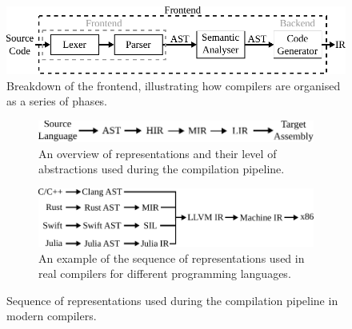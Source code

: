 \begin{figure}[h]
  \centering
  \includegraphics[scale=0.9]{src/background/figs/compiler-frontend.pdf}
  \caption{Breakdown of the frontend, illustrating how compilers are organised as a series of phases.}
  \label{fig:compiler-frontend}
\end{figure}

\begin{figure}[h]
\centering
\begin{subfigure}{\textwidth}
\centering
  \includegraphics[scale=0.9]{src/background/figs/ir-lowering-sequence.pdf}
  \caption{An overview of representations and their level of abstractions used during the compilation pipeline.}
  \label{fig:ir-lowering-sequence-general}
\end{subfigure}
\begin{subfigure}{\textwidth}
\centering
  \includegraphics[scale=0.9]{src/background/figs/ir-lowering-sequence-example.pdf}
  \caption{An example of the sequence of representations used in real compilers for different programming languages.}
  \label{fig:ir-lowering-sequence-example}
\end{subfigure}
\caption{Sequence of representations used during the compilation pipeline in modern compilers.}
\label{fig:ir-lowering-sequence}
\end{figure}

